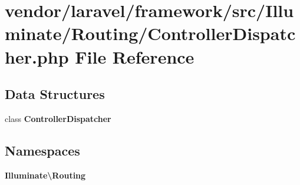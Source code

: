 \section{vendor/laravel/framework/src/\+Illuminate/\+Routing/\+Controller\+Dispatcher.php File Reference}
\label{_controller_dispatcher_8php}
\subsection*{Data Structures}
\begin{DoxyCompactItemize}
\item 
class {\bf Controller\+Dispatcher}
\end{DoxyCompactItemize}
\subsection*{Namespaces}
\begin{DoxyCompactItemize}
\item 
 {\bf Illuminate\textbackslash{}\+Routing}
\end{DoxyCompactItemize}
